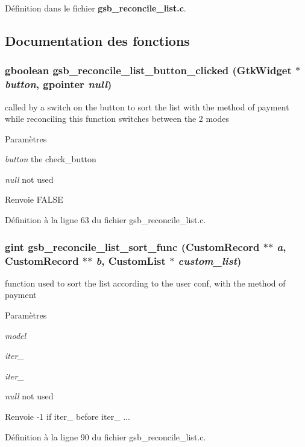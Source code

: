 Définition dans le fichier {\bf gsb\_\-reconcile\_\-list.c}.



\subsection{Documentation des fonctions}
\subsubsection[{gsb\_\-reconcile\_\-list\_\-button\_\-clicked}]{\setlength{\rightskip}{0pt plus 5cm}gboolean gsb\_\-reconcile\_\-list\_\-button\_\-clicked (GtkWidget $\ast$ {\em button}, \/  gpointer {\em null})}\label{gsb__reconcile__list_8c_a247eaf28cea2bed53eb6048878100f35}
called by a switch on the button to sort the list with the method of payment while reconciling this function switches between the 2 modes


\begin{DoxyParams}{Paramètres}
\item[{\em button}]the check\_\-button \item[{\em null}]not used\end{DoxyParams}
\begin{DoxyReturn}{Renvoie}
FALSE 
\end{DoxyReturn}


Définition à la ligne 63 du fichier gsb\_\-reconcile\_\-list.c.

\subsubsection[{gsb\_\-reconcile\_\-list\_\-sort\_\-func}]{\setlength{\rightskip}{0pt plus 5cm}gint gsb\_\-reconcile\_\-list\_\-sort\_\-func ({\bf CustomRecord} $\ast$$\ast$ {\em a}, \/  {\bf CustomRecord} $\ast$$\ast$ {\em b}, \/  {\bf CustomList} $\ast$ {\em custom\_\-list})}\label{gsb__reconcile__list_8c_ab702a2bc4806b81e6d3c32c5606f2e8f}
function used to sort the list according to the user conf, with the method of payment


\begin{DoxyParams}{Paramètres}
\item[{\em model}]\item[{\em iter\_\-1}]\item[{\em iter\_\-2}]\item[{\em null}]not used\end{DoxyParams}
\begin{DoxyReturn}{Renvoie}
-\/1 if iter\_ before iter\_ ... 
\end{DoxyReturn}


Définition à la ligne 90 du fichier gsb\_\-reconcile\_\-list.c.

